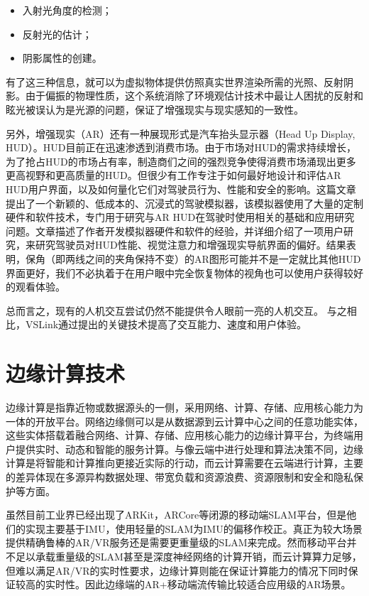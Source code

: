 \begin{itemize}
	\item 入射光角度的检测；
	\item 反射光的估计；
	\item 阴影属性的创建。
\end{itemize}

有了这三种信息，就可以为虚拟物体提供仿照真实世界渲染所需的光照、反射阴影。由于偏振的物理性质，这个系统消除了环境观估计技术中最让人困扰的反射和眩光被误认为是光源的问题，保证了增强现实与现实感知的一致性。

另外，增强现实（AR）还有一种展现形式是汽车抬头显示器（Head Up Display, HUD）。HUD目前正在迅速渗透到消费市场。由于市场对HUD的需求持续增长，为了抢占HUD的市场占有率，制造商们之间的强烈竞争使得消费市场涌现出更多更高视野和更高质量的HUD。但很少有工作专注于如何最好地设计和评估AR HUD用户界面，以及如何量化它们对驾驶员行为、性能和安全的影响。这篇文章\cite{GabSmiTan19}提出了一个新颖的、低成本的、沉浸式的驾驶模拟器，该模拟器使用了大量的定制硬件和软件技术，专门用于研究与AR HUD在驾驶时使用相关的基础和应用研究问题。文章描述了作者开发模拟器硬件和软件的经验，并详细介绍了一项用户研究，来研究驾驶员对HUD性能、视觉注意力和增强现实导航界面的偏好。结果表明，保角（即两线之间的夹角保持不变）的AR图形可能并不是一定就比其他HUD界面更好，我们不必执着于在用户眼中完全恢复物体的视角也可以使用户获得较好的观看体验。

总而言之，现有的人机交互尝试仍然不能提供令人眼前一亮的人机交互。
与之相比，VSLink通过提出的关键技术提高了交互能力、速度和用户体验。

\section{边缘计算技术}
边缘计算是指靠近物或数据源头的一侧，采用网络、计算、存储、应用核心能力为一体的开放平台。网络边缘侧可以是从数据源到云计算中心之间的任意功能实体，这些实体搭载着融合网络、计算、存储、应用核心能力的边缘计算平台，为终端用户提供实时、动态和智能的服务计算。与像云端中进行处理和算法决策不同，边缘计算是将智能和计算推向更接近实际的行动，而云计算需要在云端进行计算，主要的差异体现在多源异构数据处理、带宽负载和资源浪费、资源限制和安全和隐私保护等方面。

虽然目前工业界已经出现了ARKit，ARCore等闭源的移动端SLAM平台，但是他们的实现主要基于IMU，使用轻量的SLAM为IMU的偏移作校正。真正为较大场景提供精确鲁棒的AR/VR服务还是需要更重量级的SLAM来完成。然而移动平台并不足以承载重量级的SLAM甚至是深度神经网络的计算开销，而云计算算力足够，但难以满足AR/VR的实时性要求，边缘计算则能在保证计算能力的情况下同时保证较高的实时性。因此边缘端的AR+移动端流传输比较适合应用级的AR场景。

